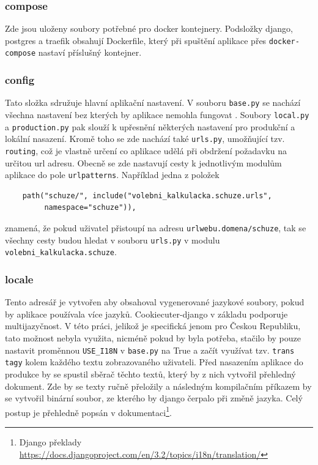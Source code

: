 \subsubsection{compose}
Zde jsou uloženy soubory potřebné pro docker kontejnery. Podsložky django, postgres a traefik obsahují Dockerfile, který při spuštění aplikace přes \texttt{docker-compose} nastaví příslušný kontejner.

\subsubsection{config}
Tato složka sdružuje hlavní aplikační nastavení. V souboru \texttt{base.py} se nachází všechna nastavení bez kterých by aplikace nemohla fungovat . Soubory \texttt{local.py} a \texttt{production.py} pak slouží k upřesnění některých nastavení pro produkční a lokální nasazení. Kromě toho se zde nachází také \texttt{urls.py}, umožňující tzv. \texttt{routing}, což je vlastně určení co aplikace udělá při obdržení požadavku na určitou url adresu. Obecně se zde nastavují cesty k jednotlivým modulům aplikace do pole \texttt{urlpatterns}. Například jedna z položek
\begin{verbatim}
    path("schuze/", include("volebni_kalkulacka.schuze.urls", 
         namespace="schuze")),
\end{verbatim}

znamená, že pokud uživatel přistoupí na adresu \texttt{urlwebu.domena/schuze}, tak se všechny cesty budou hledat v souboru \texttt{urls.py} v modulu \texttt{volebni\_kalkulacka.schuze}.

\subsubsection{locale}
Tento adresář je vytvořen aby obsahoval vygenerované jazykové soubory, pokud by aplikace používala více jazyků. Cookiecuter-django v základu podporuje multijazyčnost. V této práci, jelikož je specifická jenom pro Českou Republiku, tato možnost nebyla využita, nicméně pokud by byla potřeba, stačilo by pouze nastavit proměnnou \texttt{USE\_I18N} v \texttt{base.py} na True a začít využívat tzv. \texttt{trans tagy} kolem každého textu zobrazovaného uživateli. Před nasazením aplikace do produkce by se spustil sběrač těchto textů, který by z nich vytvořil přehledný dokument. Zde by se texty ručně přeložily a následným kompilačním příkazem by se vytvořil binární soubor, ze kterého by django čerpalo při změně jazyka. Celý postup je přehledně popsán v dokumentaci\footnote{Django překlady \url{https://docs.djangoproject.com/en/3.2/topics/i18n/translation/}}.


